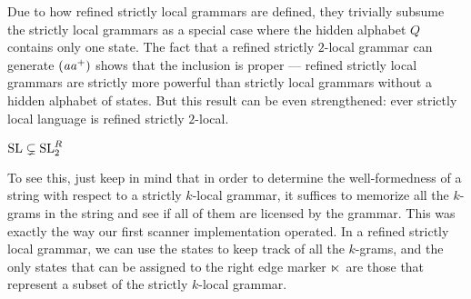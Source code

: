 Due to how refined strictly local grammars are defined, they trivially subsume the strictly local grammars as a special case where the hidden alphabet $Q$ contains only one state.
The fact that a refined strictly $2$-local grammar can generate $(\mathit{aa}^+)$ shows that the inclusion is proper --- refined strictly local grammars are strictly more powerful than strictly local grammars without a hidden alphabet of states.
But this result can be even strengthened: ever strictly local language is refined strictly $2$-local.
%
\begin{lemma}
    $\mathrm{SL} \subsetneq \mathrm{SL}_2^R$
\end{lemma}
%
To see this, just keep in mind that in order to determine the well-formedness of a string with respect to a strictly $k$-local grammar, it suffices to memorize all the $k$-grams in the string and see if all of them are licensed by the grammar.
This was exactly the way our first scanner implementation operated.
In a refined strictly local grammar, we can use the states to keep track of all the $k$-grams, and the only states that can be assigned to the right edge marker $\ltimes$ are those that represent a subset of the strictly $k$-local grammar.
%
